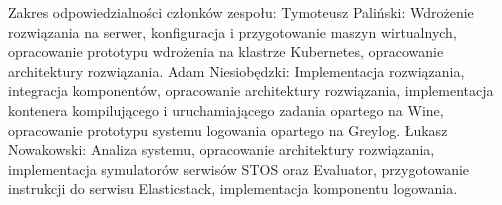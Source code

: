 \documentclass{szablonPG}
\begin{document}


\newpage
\thispagestyle{empty}
\mbox{}
\newpage



\tableofcontents








\printbibliography

\newpage
\thispagestyle{empty}
\noindent Zakres odpowiedzialności członków zespołu:
\newline Tymoteusz Paliński:
\newline Wdrożenie rozwiązania na serwer, konfiguracja i przygotowanie maszyn wirtualnych, opracowanie prototypu wdrożenia na klastrze Kubernetes, opracowanie architektury rozwiązania.
\newline Adam Niesiobędzki: 
\newline Implementacja rozwiązania, integracja komponentów, opracowanie architektury rozwiązania, implementacja kontenera kompilującego i uruchamiającego zadania opartego na Wine, opracowanie prototypu systemu logowania opartego na Greylog.
\newline Łukasz Nowakowski:
\newline Analiza systemu, opracowanie architektury rozwiązania, implementacja symulatorów serwisów STOS oraz Evaluator, przygotowanie instrukcji do serwisu Elasticstack, implementacja komponentu logowania.
\newpage
\end{document}
